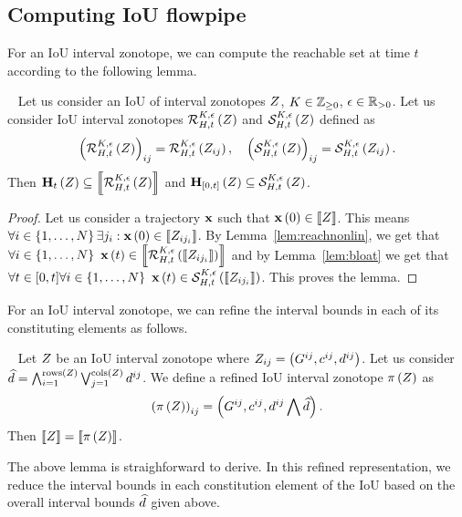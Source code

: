 \subsection{Computing IoU flowpipe}
For an IoU interval zonotope, we can compute the reachable
set at time $t$ according to the following lemma.
%
\begin{lemma}~\label{lem:ioureach}
Let us consider an IoU of interval zonotopes $Z$,
$K\in\mathbb{Z}_{\geq 0}$, $\epsilon\in\mathbb{R}_{>0}$.  Let us consider
IoU interval zonotopes $\mathcal{R}_{H,t}^{K,\epsilon}\left(Z\right)$ and
$\mathcal{S}_{H,t}^{K,\epsilon}\left(Z\right)$ defined as
%
\begin{align*}
\left(\mathcal{R}_{H,t}^{K,\epsilon}\left(Z\right)\right)_{ij}
= \mathcal{R}_{H,t}^{K,\epsilon}\left(Z_{ij}\right),~~~
\left(\mathcal{S}_{H,t}^{K,\epsilon}\left(Z\right)\right)_{ij}
= \mathcal{S}_{H,t}^{K,\epsilon}\left(Z_{ij}\right).
\end{align*}
%
Then
$\mathbf{H}_{t}\left(Z\right)\subseteq \left\llbracket{\mathcal{R}_{H,t}^{K,\epsilon}\left(Z\right)}\right\rrbracket$ and
$\mathbf{H}_{[0,t]}\left(Z\right)\subseteq \mathcal{S}_{H,t}^{K,\epsilon}\left(Z\right)$.
\end{lemma}
%
\begin{proof}
Let us consider a trajectory $\mathbf{x}$ such that $\mathbf{x}\left(0\right)\in\left\llbracket{Z}\right\rrbracket$.
This means $\forall i\in\left\{1,\ldots,N\right\} \exists
j_i:\mathbf{x}\left(0\right)\in\left\llbracket{Z_{ij_i}}\right\rrbracket$.  By Lemma~\ref{lem:reachnonlin}, we get
that $\forall
i\in\left\{1,\ldots,N\right\}~\mathbf{x}\left(t\right)\in\left\llbracket{\mathcal{R}_{H,t}^{K,\epsilon}\left(\left\llbracket{Z_{ij_i}}\right\rrbracket\right)}\right\rrbracket$
and by Lemma~\ref{lem:bloat} we get that $\forall t\in[0,t]\forall
i\in\left\{1,\ldots,N\right\}~\mathbf{x}\left(t\right)\in\mathcal{S}_{H,t}^{K,\epsilon}\left(\left\llbracket{Z_{ij_i}}\right\rrbracket\right)$.
This proves the lemma.
\end{proof}
%
For an IoU interval zonotope, we can refine the interval bounds in
each of its constituting elements as follows. 
%
\begin{lemma}~\label{lem:refine}
Let $Z$ be an IoU interval zonotope where $Z_{ij}
= \left(G^{ij},c^{ij},d^{ij}\right)$.  Let us consider $\widehat{d}
= \bigwedge_{i=1}^{\operatorname{rows}\left(Z\right)}\bigvee_{j=1}^{\operatorname{cols}\left(Z\right)}d^{ij}$.  We
define a refined IoU interval zonotope $\operatorname*{\pi}\left(Z\right)$ as
%
\[
\left(\operatorname*{\pi}\left(Z\right)\right)_{ij}
= \left(G^{ij},{c^{ij}},{d^{ij}\bigwedge \widehat{d}}\right).
\]
%
Then $\left\llbracket{Z}\right\rrbracket = \left\llbracket{\operatorname*{\pi}\left(Z\right)}\right\rrbracket$.
\end{lemma}
%
The above lemma is straighforward to derive.  In this refined
representation, we reduce the interval bounds in each constitution
element of the IoU based on the overall interval bounds $\widehat{d}$
given above.

